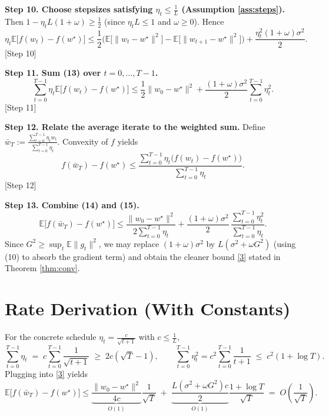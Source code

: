 \documentclass{article}
\begin{document}
\noindent\textbf{Step 10. Choose stepsizes satisfying $\eta_t\le\frac{1}{L}$ (Assumption \ref{ass:steps}).}  
Then $1-\eta_t L(1+\omega)\ge \frac12$ (since $\eta_t L\le 1$ and $\omega\ge0$). Hence
\[
\eta_t\mathbb{E}\!\big[f(w_t)-f(w^{\star})\big]
\le
\frac{1}{2}\Big(\mathbb{E}\!\big[\|w_t-w^{\star}\|^{2}\big]
-\mathbb{E}\!\big[\|w_{t+1}-w^{\star}\|^{2}\big]\Big)
+\frac{\eta_t^{2}(1+\omega)\sigma^{2}}{2}. \tag{13}
\]
[Step 10]

\noindent\textbf{Step 11. Sum (13) over $t=0,\dots,T-1$.}
\[
\sum_{t=0}^{T-1}\eta_t\mathbb{E}\!\big[f(w_t)-f(w^{\star})\big]
\le
\frac{1}{2}\|w_0-w^{\star}\|^{2}
+\frac{(1+\omega)\sigma^{2}}{2}\sum_{t=0}^{T-1}\eta_t^{2}. \tag{14}
\]
[Step 11]

\noindent\textbf{Step 12. Relate the average iterate to the weighted sum.}  
Define $\bar w_T:=\frac{\sum_{t=0}^{T-1}\eta_t w_t}{\sum_{t=0}^{T-1}\eta_t}$.  
Convexity of $f$ yields
\[
f(\bar w_T)-f(w^{\star})\le 
\frac{\sum_{t=0}^{T-1}\eta_t\big(f(w_t)-f(w^{\star})\big)}
{\sum_{t=0}^{T-1}\eta_t}. \tag{15}
\]
[Step 12]

\noindent\textbf{Step 13. Combine (14) and (15).}
\[
\mathbb{E}\!\big[f(\bar w_T)-f(w^{\star})\big]
\le
\frac{\|w_0-w^{\star}\|^{2}}{2\sum_{t=0}^{T-1}\eta_t}
+\frac{(1+\omega)\sigma^{2}}{2}\,
\frac{\sum_{t=0}^{T-1}\eta_t^{2}}{\sum_{t=0}^{T-1}\eta_t}. \tag{16}
\]
Since $G^{2}\ge\sup_t\mathbb{E}\|g_t\|^{2}$, we may replace $(1+\omega)\sigma^{2}$ by $L(\sigma^{2}+\omega G^{2})$ (using (10) to absorb the gradient term) and obtain the cleaner bound \eqref{3} stated in Theorem \ref{thm:conv}. \qedhere

\section*{Rate Derivation (With Constants)}
For the concrete schedule $\eta_t=\frac{c}{\sqrt{t+1}}$ with $c\le\frac{1}{L}$,
\[
\sum_{t=0}^{T-1}\eta_t \;=\; c\sum_{t=0}^{T-1}\frac{1}{\sqrt{t+1}}
\;\ge\; 2c(\sqrt{T}-1),\qquad
\sum_{t=0}^{T-1}\eta_t^{2}=c^{2}\sum_{t=0}^{T-1}\frac{1}{t+1}
\;\le\; c^{2}(1+\log T).
\]
Plugging into \eqref{3} yields
\[
\mathbb{E}\!\big[f(\bar w_T)-f(w^{\star})\big]
\le
\underbrace{\frac{\|w_0-w^{\star}\|^{2}}{4c}}_{\displaystyle O(1)}
\frac{1}{\sqrt{T}}
\;+\;
\underbrace{\frac{L(\sigma^{2}+\omega G^{2})c}{2}}_{\displaystyle O(1)}
\frac{1+\log T}{\sqrt{T}}
\;=\; O\!\left(\frac{1}{\sqrt{T}}\right).
\]
\end{document}
